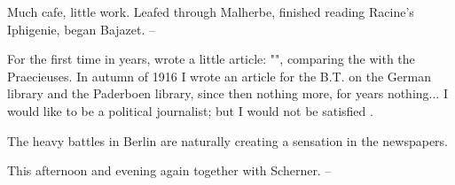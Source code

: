 
Much cafe, little work. Leafed through Malherbe, finished reading Racine's Iphigenie, began Bajazet. --

For the first time in years, wrote a little article: "", comparing the  with the Praecieuses. In autumn of 1916 I wrote an article for the B.T. on the German library and the Paderboen library, since then nothing more, for years nothing... I would like to be a political journalist; but I would not be satisfied .

The heavy battles in Berlin are naturally creating a sensation in the newspapers.

This afternoon and evening again together with Scherner. --